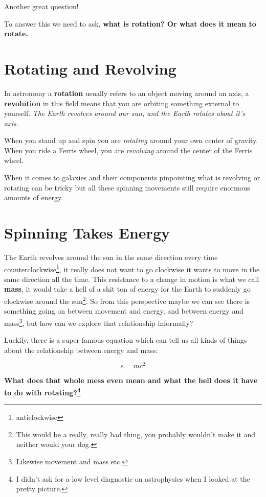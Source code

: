 \documentclass[10pt,letterpaper]{article}
\begin{document}
Another great question!

To answer this we need to ask, \textbf{what is rotation? Or what does it mean to rotate.}


\section*{Rotating and Revolving}

In astronomy a \textbf{rotation} usually refers to an object moving around an axis, a \textbf{revolution} in this field means that you are orbiting something external to yourself. \textit{The Earth revolves around our sun, and the Earth rotates about it's axis.}

When you stand up and spin you are \textit{rotating} around your own center of gravity. When you ride a Ferris wheel, you are \textit{revolving} around the center of the Ferris wheel. 

When it comes to galaxies and their components pinpointing what is revolving or rotating can be tricky but all these spinning movements still require enormous amounts of energy.

\section*{Spinning Takes Energy}

The Earth revolves around the sun in the same direction every time counterclockwise\footnote{anticlockwise}, it really does not want to go clockwise it wants to move in the same direction all the time. This resistance to a change in motion is what we call \textbf{mass}, it would take a hell of a shit ton of energy for the Earth to suddenly go clockwise around the sun\footnote{This would be a really, really bad thing, you probably wouldn't make it and neither would your dog.}. So from this perspective maybe we can see there is something going on between movement and energy, and between energy and mass\footnote{Likewise movement and mass etc.}, but how can we explore that relationship informally?


Luckily, there is a super famous equation which can tell us all kinds of things about the relationship between energy and mass:

\[e=mc^{2}\]

\textbf{What does that whole mess even mean and what the hell does it have to do with rotating?\footnote{I didn't ask for a low level diagnostic on astrophysics when I looked at the pretty picture.}}
\end{document}
